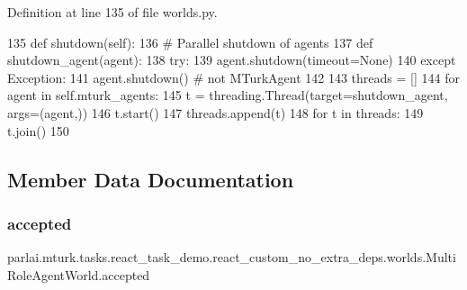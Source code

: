 Definition at line 135 of file worlds.\+py.


\begin{DoxyCode}
135     \textcolor{keyword}{def }shutdown(self):
136         \textcolor{comment}{# Parallel shutdown of agents}
137         \textcolor{keyword}{def }shutdown\_agent(agent):
138             \textcolor{keywordflow}{try}:
139                 agent.shutdown(timeout=\textcolor{keywordtype}{None})
140             \textcolor{keywordflow}{except} Exception:
141                 agent.shutdown()  \textcolor{comment}{# not MTurkAgent}
142 
143         threads = []
144         \textcolor{keywordflow}{for} agent \textcolor{keywordflow}{in} self.mturk\_agents:
145             t = threading.Thread(target=shutdown\_agent, args=(agent,))
146             t.start()
147             threads.append(t)
148         \textcolor{keywordflow}{for} t \textcolor{keywordflow}{in} threads:
149             t.join()
150 
\end{DoxyCode}


\subsection{Member Data Documentation}
\mbox{\label{classparlai_1_1mturk_1_1tasks_1_1react__task__demo_1_1react__custom__no__extra__deps_1_1worlds_1_1MultiRoleAgentWorld_a9f87c9800c646c43458925554bfba794}} 
\subsubsection{\texorpdfstring{accepted}{accepted}}
{\footnotesize\ttfamily parlai.\+mturk.\+tasks.\+react\+\_\+task\+\_\+demo.\+react\+\_\+custom\+\_\+no\+\_\+extra\+\_\+deps.\+worlds.\+Multi\+Role\+Agent\+World.\+accepted}



